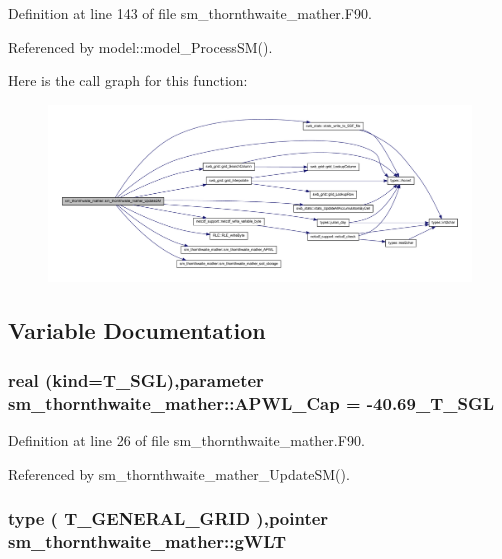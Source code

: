 Definition at line 143 of file sm\_\-thornthwaite\_\-mather.F90.



Referenced by model::model\_\-ProcessSM().



Here is the call graph for this function:\nopagebreak
\begin{figure}[H]
\begin{center}
\leavevmode
\includegraphics[width=400pt]{namespacesm__thornthwaite__mather_a233ae5f65335221fe1cfeefbc50571cf_cgraph}
\end{center}
\end{figure}




\subsection{Variable Documentation}
\hypertarget{namespacesm__thornthwaite__mather_a3c2fee3b14d954659c5d846b6277217c}{
\subsubsection[{APWL\_\-Cap}]{\setlength{\rightskip}{0pt plus 5cm}real (kind=T\_\-SGL),parameter {\bf sm\_\-thornthwaite\_\-mather::APWL\_\-Cap} = -\/40.69\_\-T\_\-SGL}}
\label{namespacesm__thornthwaite__mather_a3c2fee3b14d954659c5d846b6277217c}


Definition at line 26 of file sm\_\-thornthwaite\_\-mather.F90.



Referenced by sm\_\-thornthwaite\_\-mather\_\-UpdateSM().

\hypertarget{namespacesm__thornthwaite__mather_afc44d31c08d31d440d84bf36d87547f4}{
\subsubsection[{gWLT}]{\setlength{\rightskip}{0pt plus 5cm}type ( {\bf T\_\-GENERAL\_\-GRID} ),pointer {\bf sm\_\-thornthwaite\_\-mather::gWLT}}}
\label{namespacesm__thornthwaite__mather_afc44d31c08d31d440d84bf36d87547f4}


